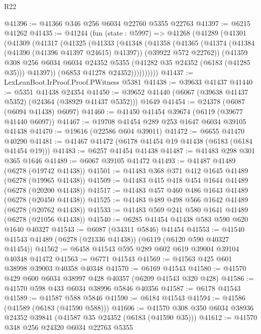 \begin{lexlean}{R22}
\begin{coremodule}
@41396 := @41366 @346 @256 @6034 @22760 @5355 @22763
@41397 := @6215 @41262
@41435 := @41244
    (fun (state : @5997) =>
    @41268
      (@41289
        (@41301
          (@41309
            (@41317
              (@41325
                (@41333
                  (@41348
                    (@41358
                      (@41365
                        (@41374
                          (@41384 (@41390 (@41396 @41397 @24615) @41397))
                          (@39922 @572 @22762))
                        (@41359
                          @308
                          @256
                          @6034
                          @6034
                          @24352
                          @5355
                          (@41282 @35 @24352 (@6183 (@41285 @35)))
                          @41397))
                      (@6853 @41278 @24352))))))))))
@41437 := LexLeanBoot.IrProof.Proof.PWitness @5381
@41438 := @39633 @41437
@41440 := @5351 @41438 @24354
@41450 := @39652 @41440 (@6067 (@39638 @41437 @5352) (@24364 (@38929 @41437 @5352))) @1649
@41454 := @24378 (@6087 (@6094 @41438) @6097)
@41460 := @41450 @41454 @39674 (@6119 (@39677 @41440 @6097))
@41467 := @19708 @41454 @289 @253 @1647 @6034 @39105 @41438
@41470 := @19616 (@22586 @604 @39011)
@41472 := @6655 @41470 @40290
@41481 := @41467 @41472 (@6178 @41454 @19 @41438 (@6183 (@6184 @41454 @19)))
@41483 := @6257 @41454 @41438
@41487 := @41483 @298 @301 @365 @1646
@41489 := @6067 @39105 @41472
@41493 := @41487 @41489 (@6278 (@19742 @41438))
@41501 := @41483 @368 @371 @412 @1645 @41489 (@6278 (@19965 @41438))
@41509 := @41483 @415 @418 @454 @1644 @41489 (@6278 (@20200 @41438))
@41517 := @41483 @457 @460 @486 @1643 @41489 (@6278 (@20450 @41438))
@41525 := @41483 @489 @498 @566 @1642 @41489 (@6278 (@20762 @41438))
@41533 := @41483 @569 @241 @580 @1641 @41489 (@6278 (@21056 @41438))
@41540 := @6285 @41454 @41438 @583 @590 @620 @1640 @40327
@41543 := @6087 (@34311 @5846) @41454
@41553 := @41540 @41543 @41489 (@6278 (@21336 @41438)) (@6119 (@6120 @590 @40327 @41454))
@41562 := @6458 @41543 @595 @289 @602 @619 @39004 @39104 @40348 @41472
@41563 := @6771 @41543
@41569 := @41563 @425 @601 @38998 @39003 @40358 @40348
@41570 := @6169 @41543
@41580 := @41570 @429 @600 @6034 @38997 @428 @40357 (@6209 @41543 @320 @428)
@41586 := @41570 @598 @433 @6034 @38996 @5846 @40356
@41587 := @6178 @41543
@41589 := @41587 @588 @5846
@41590 := @6184 @41543
@41594 := @41586 (@41589 (@6183 (@41590 @588)))
@41606 := @41570 @308 @350 @6034 @38936 @24352 @39841 (@41587 @35 @24352 (@6183 (@41590 @35)))
@41612 := @41570 @348 @256 @24320 @6034 @22763 @5355

\end{coremodule}
\end{lexlean}
